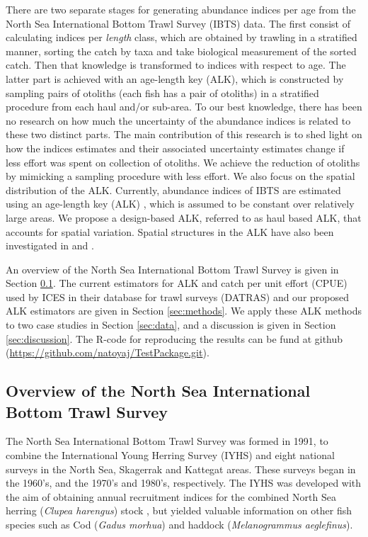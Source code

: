 \documentclass[a4paper 12pt]{article}
\numberwithin{equation}{section}
\begin{document}
There are two separate stages for generating abundance indices per age from the North Sea International Bottom Trawl Survey (IBTS) data.  The first consist of calculating indices per \textit{length} class, which are obtained by trawling in a stratified manner, sorting the catch by taxa and take biological measurement of the sorted catch. Then that knowledge is transformed to indices with respect to age. The latter part is achieved with an age-length key (ALK), which is constructed by sampling pairs of otoliths (each fish has a pair of otoliths)  in a stratified procedure from each haul and/or sub-area. To our best knowledge, there has been no research on how much the uncertainty of the abundance indices is related to these two distinct parts. The main contribution of this research is to shed light on how the indices estimates and their associated uncertainty estimates change if less effort was spent on collection of otoliths. We achieve the reduction of otoliths by mimicking a sampling procedure with less effort. We also focus on the spatial distribution of the ALK. Currently, abundance indices of IBTS are estimated using an age-length key (ALK) \citep{fridriksson1934calculation}, which is assumed to be constant over relatively large areas. We propose a design-based ALK, referred to as haul based ALK, that accounts for spatial variation. Spatial structures in the ALK have also been investigated in \citet{berg2012spatial} and  \citet{hirst2012bayesian}. 

An  overview of the  North Sea International Bottom Trawl Survey is given in Section \ref{overview}. The current estimators for ALK and catch per unit effort (CPUE) used by ICES in their database for trawl surveys (DATRAS) and our proposed ALK estimators are given in Section \ref{sec:methods}. We apply these ALK methods to two case studies in Section  \ref{sec:data}, and a discussion is given in Section \ref{sec:discussion}. The R-code for reproducing the results can be fund at github (\href{https://github.com/natoyaj/TestPackage.git}{https://github.com/natoyaj/TestPackage.git}).
 

\subsection{Overview of the North Sea International Bottom Trawl Survey}
\label{overview}
\indent The North Sea International Bottom Trawl Survey was formed in 1991, to combine the International Young Herring Survey (IYHS) and eight national surveys in the North Sea, Skagerrak and Kattegat areas. These surveys began in the 1960's, and the 1970's and 1980's, respectively. The IYHS was developed with the aim of obtaining annual recruitment indices for the combined North Sea herring (\textit{Clupea harengus}) stock \citep{ICES2012}, but yielded valuable information on other fish species such as Cod (\textit{Gadus morhua}) and haddock (\textit{Melanogrammus aeglefinus}).
\end{document}
